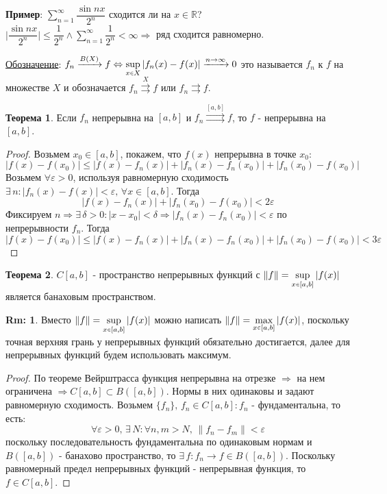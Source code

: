 \documentclass[12pt]{article}
\newcommand{\MR}{\mathbb{R}}
\newcommand{\VE}{\varepsilon}
\theoremstyle{definition}
\newtheorem{rem}{Rm:}
\newtheorem{theorem}{Теорема}
\newcommand{\smallerrel}[1]{\mathrel{\mathpalette\smallerrelaux{#1}}}
\newcommand{\smallerrelaux}[2]{\raisebox{.1ex}{\scalebox{.75}{$#1#2$}}}
\newcommand{\smallin}{\smallerrel{\in}}
\begin{document}
\textbf{Пример}: $\displaystyle \sum\limits_{n=1}^{\infty}\dfrac{\sin{nx}}{2^n}$ сходится ли на $x \in \MR$? $\Big|\dfrac{\sin{nx}}{2^n}\Big| \leq \dfrac{1}{2^n} \wedge \displaystyle \sum\limits_{n=1}^{\infty}\dfrac{1}{2^n} < \infty \Rightarrow$ ряд сходится равномерно.

\uline{Обозначение}: $f_n \xrightarrow[]{B(X)} f \Leftrightarrow \sup\limits_{x \smallin X}|f_n(x) - f(x)| \xrightarrow[]{n\to \infty} 0$ это называется  $f_n$ к $f$ на множестве $X$ и обозначается $f_n \overset{X}{\rightrightarrows}f$ или $f_n \rightrightarrows f$.

\begin{theorem}
	Если $f_n$ непрерывна на $[a,b]$ и $f_n\overset{[a,b]}{\rightrightarrows}f$, то $f$ - непрерывна на $[a,b]$.
\end{theorem}
\begin{proof}
	Возьмем $x_0 \in [a,b]$, покажем, что $f(x)$ непрерывна в точке $x_0$:
	$$
		|f(x) - f(x_0)| \leq |f(x) - f_n(x)| + |f_n(x) - f_n(x_0)| + |f_n(x_0) - f(x_0)|
	$$
	Возьмем $\forall \VE > 0$, используя равномерную сходимость $\exists \, n \colon |f_n(x) - f(x)| < \VE, \, \forall x \in [a,b]$. Тогда 
	$$
		|f(x) - f_n(x)| + |f_n(x_0) - f(x_0)| < 2 \VE
	$$
	Фиксируем $n \Rightarrow \exists \, \delta > 0 \colon |x - x_0| < \delta \Rightarrow |f_n(x) - f_n(x_0)| < \VE$ по непрерывности $f_n$. Тогда 
	$$
		|f(x) - f(x_0)| \leq |f(x) - f_n(x)| + |f_n(x) - f_n(x_0)| + |f_n(x_0) - f(x_0)| < 3 \VE
	$$
\end{proof}

\begin{theorem}
	$C[a,b]$ - пространство непрерывных функций с $\|f\| = \sup\limits_{x\smallin [a,b]}|f(x)|$ является банаховым пространством. 
\end{theorem}
\begin{rem}
	Вместо $\|f\| = \sup\limits_{x\smallin [a,b]}|f(x)|$ можно написать $\|f\| = \max\limits_{x\smallin [a,b]}|f(x)|$, поскольку точная верхняя грань у непрерывных функций обязательно достигается, далее для непрерывных функций будем использовать максимум.
\end{rem}
\begin{proof}
	По теореме Вейрштрасса функция непрерывна на отрезке $\Rightarrow$ на нем ограничена $\Rightarrow C[a,b] \subset B([a,b])$. Нормы в них одинаковы и задают равномерную сходимость. Возьмем $\{f_n\}, \, f_n \in C[a,b] \colon f_n$ - фундаментальна, то есть:
	$$
		\forall \VE > 0, \, \exists \, N \colon \forall n,m > N, \, \|f_n - f_m\| < \VE
	$$
	поскольку последовательность фундаментальна по одинаковым нормам и $B([a,b])$ - банахово пространство, то $\exists \, f \colon f_n \to f \in B([a,b])$. Поскольку равномерный предел непрерывных функций - непрерывная функция, то $f \in C[a,b]$.
\end{proof}
\end{document}
